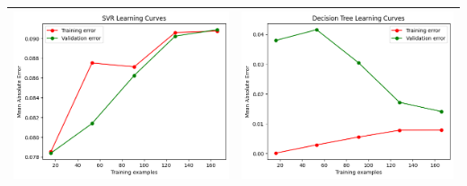\begin{table}[H]
    \centering
    \footnotesize
    \setlength\tabcolsep{0pt}
    \begin{tabularx}{\textwidth}{|X|X|}
        \hline
        \includegraphics[width=\linewidth, trim=0 0 0 0]{images/SVR_lc70.png} &
        \includegraphics[width=\linewidth, trim=0 0 0 0]{images/DecisionTree_lc70.png} \\
        \hline

\end{tabularx}
\end{table}
